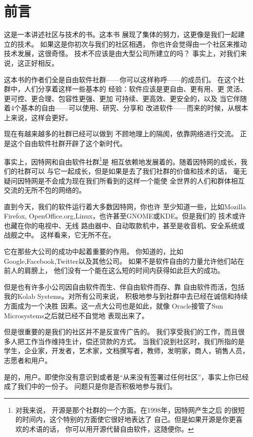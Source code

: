 ﻿\section*{前言}

这是一本讲述社区与技术的书。这本书
展现了集体的努力，这更像是我们一起建立的技术。
如果这是你初次与我们的社区相遇，
你也许会觉得由一个社区来推动技术发展，这很奇怪。
技术不应该是由大型公司所建立的吗？
事实上，对我们来说，这正好相反。

这本书的作者们全是自由软件社群——你可以这样称呼——的成员们。
在这个社群中，人们分享着这样一些基本的
经验：软件应该是更自由、更有用、更
灵活、更可控、更合理、包容性更强、更加
可持续、更高效、更安全的，以及
当它伴随着4个基本的自由——可以使用、研究、分享和
改进软件——而来的时候，从根本上来说，这样会更好。

现在有越来越多的社群已经可以做到
不顾地理上的隔阂，依靠网络进行交流。
正是这个自由软件社群开辟了这个新时代。

事实上，因特网和自由软件社群\footnote{对我来说，
  开源是那个社群的一个方面。在1998年，因特网产生之后
  的很短的时间内，这个特别的方面使它很好地表达了
  自己。但是如果开源是你更喜欢的术语的话，
  你可以用开源代替自由软件，这随便你。}是
相互依赖地发展着的。随着因特网的成长，我们的社群可以
与它一起成长，但是如果是去了我们社群的价值和技术的话，
毫无疑问因特网是不会成为现在我们所看到的这样一个能使
全世界的人们和群体相互交流的无所不包的网络的。

直到今天，我们的软件运行着大多数因特网，你也许
至少知道一些，比如Mozilla Firefox,
OpenOffice.org,Linux，也许甚至GNOME或KDE。但是我们的
技术或许也藏在你的电视中、无线
路由器中、自动取款机中，甚至是收音机、安全系统或战舰之中。
这样看来，它无所不在。

它在那些大公司的成功中起着重要的作用。
你知道的，比如Google,Facebook,Twitter以及其他公司。
如果不是软件自由的力量允许他们站在前人的肩膀上，
他们没有一个能在这么短的时间内获得如此巨大的成功。

但是也有许多小公司因自由软件而生、伴自由软件而存、靠
自由软件而活，包括我的Kolab Systems。对所有公司来说，
积极地参与到社群中去已经在诚信和持续方面成为一个决胜
因素。这一点大公司也是如此，就像
Oracle接管了Sun Microsystems之后就已经不自觉地
表现出来了。

但是很重要的是我们的社区并不是反宣传广告的。
我们享受我们的工作，而且很多人把工作当作维持生计，偿还贷款的方式。 
当我们说到社区时，我们所指的是学生，企业家，开发者，艺术家，文档撰写者，教师，发明家，商人，销售人员，
志愿者和用户。

是的，用户。即使你没有意识到或者是“从来没有签署过任何社区”，事实上你已经成了我们中的一份子。
问题只是你是否积极地参与我们。

